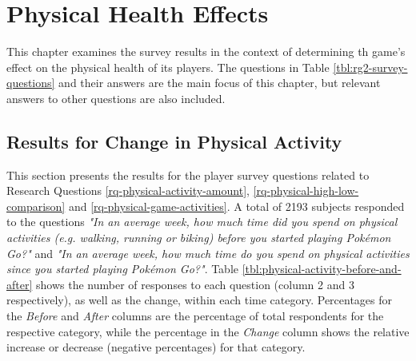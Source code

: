 \chapter{Physical Health Effects}
\label{chapter:player-study-physical}

This chapter examines the survey results in the context of determining th game's effect on the physical health of its players. The questions in Table \ref{tbl:rg2-survey-questions} and their answers are the main focus of this chapter, but relevant answers to other questions are also included.

\section{Results for Change in Physical Activity}

This section presents the results for the player survey questions related to Research Questions \ref{rq-physical-activity-amount}, \ref{rq-physical-high-low-comparison} and \ref{rq-physical-game-activities}. A total of 2193 subjects responded to the questions \emph{"In an average week, how much time did you spend on physical activities (e.g. walking, running or biking) before you started playing Pokémon Go?"} and \emph{"In an average week, how much time do you spend on physical activities since you started playing Pokémon Go?"}. Table \ref{tbl:physical-activity-before-and-after} shows the number of responses to each question (column 2 and 3 respectively), as well as the change, within each time category. Percentages for the \emph{Before} and \emph{After} columns are the percentage of total respondents for the respective category, while the percentage in the \emph{Change} column shows the relative increase or decrease (negative percentages) for that category.

